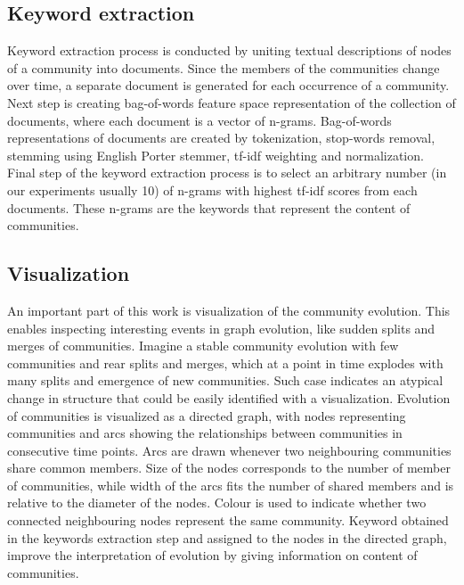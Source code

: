 \documentclass{article} %
\begin{document}
\subsection{Keyword extraction}
Keyword extraction process is conducted by uniting textual descriptions of nodes of a community into documents. Since the members of the communities change over time, a separate document is generated for each occurrence of a community. Next step is creating bag-of-words feature space representation of the collection of documents, where each document is a vector of n-grams. Bag-of-words representations of documents are created by tokenization, stop-words removal, stemming using English Porter stemmer, tf-idf weighting and normalization. Final step of the keyword extraction process is to select an arbitrary number (in our experiments usually 10) of n-grams with highest tf-idf scores from each documents. These n-grams are the keywords that represent the content of communities.

\subsection{Visualization}
An important part of this work is visualization of the community evolution. This enables inspecting interesting events in graph evolution, like sudden splits and merges of communities. Imagine a stable community evolution with few communities and rear splits and merges, which at a point in time explodes with many splits and emergence of new communities. Such case indicates an atypical change in structure that could be easily identified with a visualization. Evolution of communities is visualized as a directed graph, with nodes representing communities and arcs showing the relationships between communities in consecutive time points. Arcs are drawn whenever two neighbouring communities share common members. Size of the nodes corresponds to the number of member of communities, while width of the arcs fits the number of shared members and is relative to the diameter of the nodes. Colour is used to indicate whether two connected neighbouring nodes represent the same community. Keyword obtained in the keywords extraction step and assigned to the nodes in the directed graph, improve the interpretation of evolution by giving information on content of communities.
 
\end{document}

